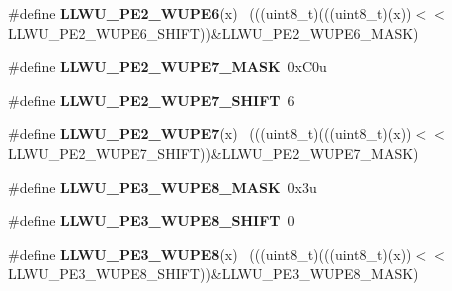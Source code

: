 \begin{DoxyCompactItemize}
\item 
\hypertarget{group___l_l_w_u___register___masks_gad35ab3e8d69e872723948df07a8ba2c9}{}\#define {\bfseries L\+L\+W\+U\+\_\+\+P\+E2\+\_\+\+W\+U\+P\+E6}(x)                                            ~(((uint8\+\_\+t)(((uint8\+\_\+t)(x))$<$$<$L\+L\+W\+U\+\_\+\+P\+E2\+\_\+\+W\+U\+P\+E6\+\_\+\+S\+H\+I\+F\+T))\&L\+L\+W\+U\+\_\+\+P\+E2\+\_\+\+W\+U\+P\+E6\+\_\+\+M\+A\+S\+K)\label{group___l_l_w_u___register___masks_gad35ab3e8d69e872723948df07a8ba2c9}

\item 
\hypertarget{group___l_l_w_u___register___masks_ga39b30f51fdd7f83bb5aa29bf2bc87c26}{}\#define {\bfseries L\+L\+W\+U\+\_\+\+P\+E2\+\_\+\+W\+U\+P\+E7\+\_\+\+M\+A\+S\+K}~0x\+C0u\label{group___l_l_w_u___register___masks_ga39b30f51fdd7f83bb5aa29bf2bc87c26}

\item 
\hypertarget{group___l_l_w_u___register___masks_ga82bfb99732d7f90dacdc01ef5222a59a}{}\#define {\bfseries L\+L\+W\+U\+\_\+\+P\+E2\+\_\+\+W\+U\+P\+E7\+\_\+\+S\+H\+I\+F\+T}~6\label{group___l_l_w_u___register___masks_ga82bfb99732d7f90dacdc01ef5222a59a}

\item 
\hypertarget{group___l_l_w_u___register___masks_ga8e25a99e51b43f2817a9e5da0e62e3bd}{}\#define {\bfseries L\+L\+W\+U\+\_\+\+P\+E2\+\_\+\+W\+U\+P\+E7}(x)                                            ~(((uint8\+\_\+t)(((uint8\+\_\+t)(x))$<$$<$L\+L\+W\+U\+\_\+\+P\+E2\+\_\+\+W\+U\+P\+E7\+\_\+\+S\+H\+I\+F\+T))\&L\+L\+W\+U\+\_\+\+P\+E2\+\_\+\+W\+U\+P\+E7\+\_\+\+M\+A\+S\+K)\label{group___l_l_w_u___register___masks_ga8e25a99e51b43f2817a9e5da0e62e3bd}

\item 
\hypertarget{group___l_l_w_u___register___masks_gabe7fce492e2c0201c4bb5af893f5a63d}{}\#define {\bfseries L\+L\+W\+U\+\_\+\+P\+E3\+\_\+\+W\+U\+P\+E8\+\_\+\+M\+A\+S\+K}~0x3u\label{group___l_l_w_u___register___masks_gabe7fce492e2c0201c4bb5af893f5a63d}

\item 
\hypertarget{group___l_l_w_u___register___masks_gaf02591badd7f37915120d0fd627cdf27}{}\#define {\bfseries L\+L\+W\+U\+\_\+\+P\+E3\+\_\+\+W\+U\+P\+E8\+\_\+\+S\+H\+I\+F\+T}~0\label{group___l_l_w_u___register___masks_gaf02591badd7f37915120d0fd627cdf27}

\item 
\hypertarget{group___l_l_w_u___register___masks_ga61f1881833fb1eecf76dca9958fe19b2}{}\#define {\bfseries L\+L\+W\+U\+\_\+\+P\+E3\+\_\+\+W\+U\+P\+E8}(x)                                            ~(((uint8\+\_\+t)(((uint8\+\_\+t)(x))$<$$<$L\+L\+W\+U\+\_\+\+P\+E3\+\_\+\+W\+U\+P\+E8\+\_\+\+S\+H\+I\+F\+T))\&L\+L\+W\+U\+\_\+\+P\+E3\+\_\+\+W\+U\+P\+E8\+\_\+\+M\+A\+S\+K)\label{group___l_l_w_u___register___masks_ga61f1881833fb1eecf76dca9958fe19b2}


\end{DoxyCompactItemize}
